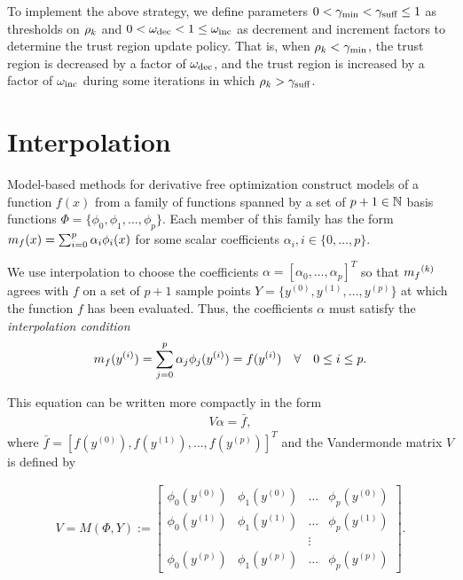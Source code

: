 To implement the above strategy,  we define parameters
$
0 < \gamma_{\textrm{min}} < \gamma_{\textrm{suff}} \le 1
$
as thresholds on $\rho_k$ and
$
0 < \omega_{\text{dec}} < 1 \le \omega_{\text{inc}}
$
as decrement and increment factors to determine the trust region update policy.
That is, when $\rho_k < \gamma_{\textrm{min}}$, the trust region is decreased by a factor of $\omega_{\text{dec}}$, and the trust region is increased by a factor of $\omega_{\text{inc}}$
during some iterations in which $\rho_k > \gamma_{\textrm{suff}}$.


\section{Interpolation}
\label{interpolation} 
Model-based methods for derivative free optimization construct models of a function $f(x)$ from a family of functions spanned by a set of $p + 1 \in \mathbb N$ basis functions  $\Phi = \{\phi_0, \phi_1, \ldots, \phi_p\}$. Each member of this family has the form ${{m}_f}(x) = \sum_{i=0}^p\alpha_i\phi_i(x)$ for some scalar coefficients $\alpha_i, i \in \{0, \ldots, p\}$.

We use interpolation to choose the coefficients $\alpha = [\alpha_0, \ldots, \alpha_p]^T$ so that ${{m}_f}^{(k)}$ agrees with $f$ on a set of $p+1$ sample points $Y = \{y^{(0)}, y^{(1)}, \ldots, y^{(p)}\}$ at which the function $f$ has been evaluated.
Thus, the coefficients $\alpha$ must satisfy the \emph{interpolation condition}
\begin{align}
\label{interpolation_condition}
{{m}_f}(y^{(i)}) = \sum^p_{j=0}\alpha_j\phi_j(y^{(i)}) = f(y^{(i)}) \quad \forall \quad 0 \le i \le p.
\end{align}

This equation can be written more compactly in the form
\begin{align}
\label{matrix_form}
V \alpha = \bar{f},
\end{align}
where $\bar{f} = [f(y^{(0)}), f(y^{(1)}), \ldots, f(y^{(p)})]^T$ and the Vandermonde matrix $V$ is defined by 

\begin{align}
\label{vandermonde}
V=M(\Phi,Y) :=
\begin{bmatrix}
    \phi_0(y^{(0)})      & \phi_1(y^{(0)})       & \ldots & \phi_{p}(y^{(0)})      \\
    \phi_0(y^{(1)})      & \phi_1(y^{(1)})       & \dots  & \phi_{p}(y^{(1)})      \\
                     &                   & \vdots &                    \\
    \phi_0(y^{(p)})    & \phi_1(y^{(p)})     & \ldots & \phi_{p}(y^{{(p)}})
\end{bmatrix}.
\end{align}


